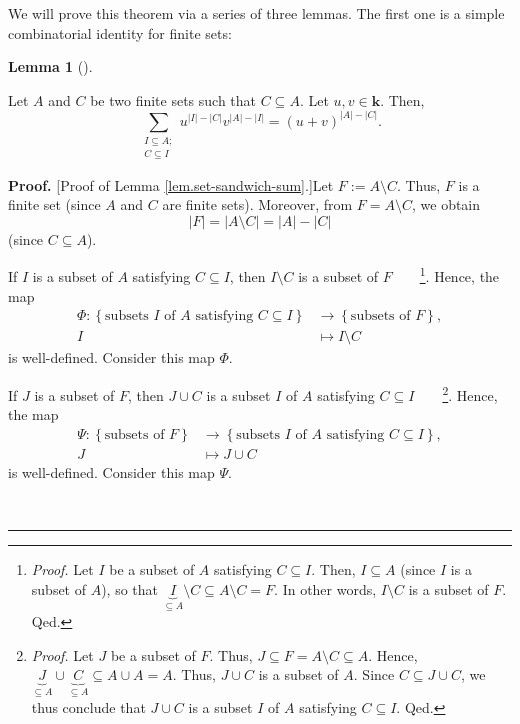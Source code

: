 \documentclass[numbers=enddot,12pt,final,onecolumn,notitlepage]{scrartcl}%
\theoremstyle{definition}
\newtheorem{lem}[theo]{Lemma}
\newenvironment{lemma}[1][]
{\begin{lem}[#1]\begin{leftbar}}
{\end{leftbar}\end{lem}}
\newenvironment{proof}[1][Proof]{\noindent\textbf{#1.} }{\ \rule{0.5em}{0.5em}}
\let\sumnonlimits\sum
\renewcommand{\sum}{\sumnonlimits\limits}
\newenvironment{verlong}{}{}
\begin{document}
\begin{verlong}
We will prove this theorem via a series of three lemmas. The first one is a
simple combinatorial identity for finite sets:

\begin{lemma}
\label{lem.set-sandwich-sum}Let $A$ and $C$ be two finite sets such that
$C\subseteq A$. Let $u,v\in\mathbf{k}$. Then,%
\[
\sum_{\substack{I\subseteq A;\\C\subseteq I}}u^{\left\vert I\right\vert
-\left\vert C\right\vert }v^{\left\vert A\right\vert -\left\vert I\right\vert
}=\left(  u+v\right)  ^{\left\vert A\right\vert -\left\vert C\right\vert }.
\]

\end{lemma}

\begin{proof}
[Proof of Lemma \ref{lem.set-sandwich-sum}.]Let $F:=A\setminus C$. Thus, $F$
is a finite set (since $A$ and $C$ are finite sets). Moreover, from
$F=A\setminus C$, we obtain
\begin{equation}
\left\vert F\right\vert =\left\vert A\setminus C\right\vert =\left\vert
A\right\vert -\left\vert C\right\vert \label{pf.lem.set-sandwich-sum.absF=}%
\end{equation}
(since $C\subseteq A$).

If $I$ is a subset of $A$ satisfying $C\subseteq I$, then $I\setminus C$ is a
subset of $F$\ \ \ \ \footnote{\textit{Proof.} Let $I$ be a subset of $A$
satisfying $C\subseteq I$. Then, $I\subseteq A$ (since $I$ is a subset of
$A$), so that $\underbrace{I}_{\subseteq A}\setminus C\subseteq A\setminus
C=F$. In other words, $I\setminus C$ is a subset of $F$. Qed.}. Hence, the map%
\begin{align*}
\Phi:\left\{  \text{subsets }I\text{ of }A\text{ satisfying }C\subseteq
I\right\}   &  \rightarrow\left\{  \text{subsets of }F\right\}  ,\\
I  &  \mapsto I\setminus C
\end{align*}
is well-defined. Consider this map $\Phi$.

If $J$ is a subset of $F$, then $J\cup C$ is a subset $I$ of $A$ satisfying
$C\subseteq I$\ \ \ \ \footnote{\textit{Proof.} Let $J$ be a subset of $F$.
Thus, $J\subseteq F=A\setminus C\subseteq A$. Hence, $\underbrace{J}%
_{\subseteq A}\cup\underbrace{C}_{\subseteq A}\subseteq A\cup A=A$. Thus,
$J\cup C$ is a subset of $A$. Since $C\subseteq J\cup C$, we thus conclude
that $J\cup C$ is a subset $I$ of $A$ satisfying $C\subseteq I$. Qed.}. Hence,
the map%
\begin{align*}
\Psi:\left\{  \text{subsets of }F\right\}   &  \rightarrow\left\{
\text{subsets }I\text{ of }A\text{ satisfying }C\subseteq I\right\}  ,\\
J  &  \mapsto J\cup C
\end{align*}
is well-defined. Consider this map $\Psi$.


\end{proof}
\end{verlong}
\end{document}
